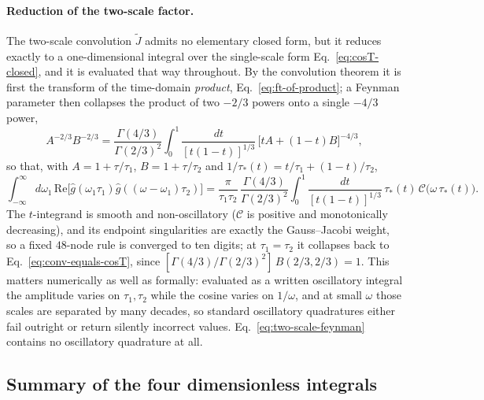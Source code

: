 \documentclass[10pt,prd,aps,nobibnotes,superscriptaddress,preprintnumbers,notitlepage]{revtex4-1}
\begin{document}
\paragraph{Reduction of the two-scale factor.}
The two-scale convolution $\tilde J$ admits no elementary closed form, but it reduces
exactly to a one-dimensional integral over the single-scale form
Eq.~\eqref{eq:cosT-closed}, and it is evaluated that way throughout. By the convolution
theorem it is first the transform of the time-domain \emph{product},
Eq.~\eqref{eq:ft-of-product}; a Feynman parameter then collapses the product of two
$-2/3$ powers onto a single $-4/3$ power,
\begin{equation}
  A^{-2/3}B^{-2/3}
  = \frac{\Gamma(4/3)}{\Gamma(2/3)^{2}}\int_{0}^{1}\!\frac{dt}{[t(1-t)]^{1/3}}\,
    \bigl[tA+(1-t)B\bigr]^{-4/3},
  \label{eq:feynman-param}
\end{equation}
so that, with $A=1+\tau/\tau_1$, $B=1+\tau/\tau_2$ and
$1/\tau_\ast(t)=t/\tau_1+(1-t)/\tau_2$,
\begin{equation}
  \int_{-\infty}^{\infty}\!d\omega_1\,
    \mathrm{Re}\bigl[\hat g(\omega_1\tau_1)\hat g((\omega-\omega_1)\tau_2)\bigr]
  = \frac{\pi}{\tau_1\tau_2}\,\frac{\Gamma(4/3)}{\Gamma(2/3)^{2}}
    \int_{0}^{1}\!\frac{dt}{[t(1-t)]^{1/3}}\,
    \tau_\ast(t)\,\mathcal{C}\bigl(\omega\,\tau_\ast(t)\bigr).
  \label{eq:two-scale-feynman}
\end{equation}
The $t$-integrand is smooth and non-oscillatory ($\mathcal{C}$ is positive and
monotonically decreasing), and its endpoint singularities are exactly the Gauss--Jacobi
weight, so a fixed $48$-node rule is converged to ten digits; at $\tau_1=\tau_2$ it
collapses back to Eq.~\eqref{eq:conv-equals-cosT}, since
$[\Gamma(4/3)/\Gamma(2/3)^{2}]\,B(2/3,2/3)=1$. This matters numerically as well as
formally: evaluated as a written oscillatory integral the amplitude varies on
$\tau_1,\tau_2$ while the cosine varies on $1/\omega$, and at small $\omega$ those scales
are separated by many decades, so standard oscillatory quadratures either fail outright
or return silently incorrect values. Eq.~\eqref{eq:two-scale-feynman} contains no
oscillatory quadrature at all.

\subsection*{Summary of the four dimensionless integrals}
\end{document}
